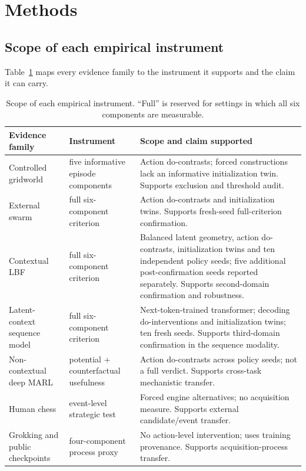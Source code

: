 \documentclass[11pt]{article}
\theoremstyle{definition}
\begin{document}
\section*{Methods}
\small

\subsection*{Scope of each empirical instrument}
Table~\ref{tab:scope-map} maps every evidence family to the instrument
it supports and the claim it can carry.

\begin{table}[t]
\centering\scriptsize
\caption{Scope of each empirical instrument. ``Full'' is reserved for
settings in which all six components are measurable.}
\label{tab:scope-map}
\begin{tabular}{>{\raggedright\arraybackslash}p{3.0cm}>{\raggedright\arraybackslash}p{3.5cm}>{\raggedright\arraybackslash}p{8.2cm}}
\toprule
\textbf{Evidence family} & \textbf{Instrument} & \textbf{Scope and claim supported} \\
\midrule
Controlled gridworld & five informative episode components &
Action do-contrasts; forced constructions lack an informative
initialization twin. Supports exclusion and threshold audit. \\
External swarm & full six-component criterion &
Action do-contrasts and initialization twins. Supports fresh-seed
full-criterion confirmation. \\
Contextual LBF & full six-component criterion &
Balanced latent geometry, action do-contrasts, initialization twins and
ten independent policy seeds; five additional post-confirmation seeds
reported separately. Supports second-domain confirmation and robustness. \\
Latent-context sequence model & full six-component criterion &
Next-token-trained transformer; decoding do-interventions and
initialization twins; ten fresh seeds. Supports third-domain
confirmation in the sequence modality. \\
Non-contextual deep MARL & potential + counterfactual usefulness &
Action do-contrasts across policy seeds; not a full verdict. Supports
cross-task mechanistic transfer. \\
Human chess & event-level strategic test &
Forced engine alternatives; no acquisition measure. Supports external
candidate/event transfer. \\
Grokking and public checkpoints & four-component process proxy &
No action-level intervention; uses training provenance. Supports
acquisition-process transfer. \\
\bottomrule
\end{tabular}
\end{table}
\end{document}
